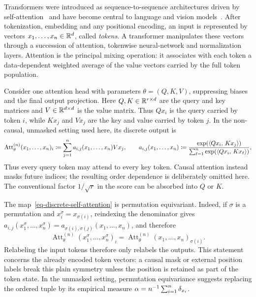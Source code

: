 Transformers were introduced as sequence-to-sequence architectures driven by self-attention~\cite{Vaswani2017Attention} and have become central to language and vision models~\cite{Brown2020LanguageModels,Dosovitskiy2021Image}. After tokenization, embedding and any positional encoding, an input is represented by vectors \(x_1,\ldots,x_n\in\mathbb{R}^d\), called \emph{tokens}. A transformer manipulates these vectors through a succession of attention, tokenwise neural-network and normalization layers. Attention is the principal mixing operation: it associates with each token a data-dependent weighted average of the value vectors carried by the full token population.

Consider one attention head with parameters \(\theta=(Q,K,V)\), suppressing biases and the final output projection. Here \(Q,K\in\mathbb{R}^{r\times d}\) are the query and key matrices and \(V\in\mathbb{R}^{d\times d}\) is the value matrix. Thus \(Qx_i\) is the query carried by token \(i\), while \(Kx_j\) and \(Vx_j\) are the key and value carried by token \(j\). In the non-causal, unmasked setting used here, its discrete output is
\begin{equation}\label{eq-discrete-self-attention}
	\operatorname{Att}^{(n)}_\theta(x_1,\ldots,x_n)_i
	\coloneqq
	\sum_{j=1}^n a_{i,j}(x_1,\ldots,x_n)Vx_j,
	\qquad
	a_{i,j}(x_1,\ldots,x_n)
	\coloneqq
	\frac{\exp(\langle Qx_i,\,Kx_j\rangle)}
	{\sum_{\ell=1}^n\exp(\langle Qx_i,\,Kx_\ell\rangle)},
\end{equation}
Thus every query token may attend to every key token. Causal attention instead masks future indices; the resulting order dependence is deliberately omitted here. The conventional factor \(1/\sqrt r\) in the score can be absorbed into \(Q\) or \(K\).

The map~\eqref{eq-discrete-self-attention} is permutation equivariant. Indeed, if \(\sigma\) is a permutation and \(x_i^\sigma=x_{\sigma(i)}\), reindexing the denominator gives \(a_{i,j}(x_1^\sigma,\ldots,x_n^\sigma)=a_{\sigma(i),\sigma(j)}(x_1,\ldots,x_n)\), and therefore
\[
	\operatorname{Att}^{(n)}_\theta(x_1^\sigma,\ldots,x_n^\sigma)_i
	=
	\operatorname{Att}^{(n)}_\theta(x_1,\ldots,x_n)_{\sigma(i)}.
\]
Relabeling the input tokens therefore only relabels the outputs. This statement concerns the already encoded token vectors: a causal mask or external position labels break this plain symmetry unless the position is retained as part of the token state. In the unmasked setting, permutation equivariance suggests replacing the ordered tuple by its empirical measure \(\alpha=n^{-1}\sum_{i=1}^n\delta_{x_i}\).

